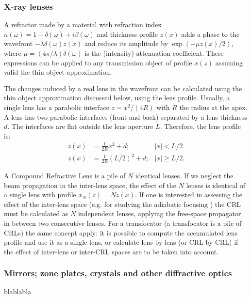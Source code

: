 \documentclass{iucr}              %
\begin{document}
\subsubsection{X-ray lenses}

A refractor made by a material with refraction index $n(\omega)=1-\delta(\omega)+i\beta(\omega)$ 
and thickness profile $z(x)$ adds a phase to the wavefront $-\lambda \delta(\omega) z(x)$ and reduce its amplitude by $\exp(-\mu z(x)/2)$, where $\mu=(4 \pi/\lambda) \delta(\omega)$ is the (intensity) attenuation coefficient. These expressions can be applied to any transmission object of profile $x(z)$ assuming valid the thin object approximation. 

The changes induced by a real lens in the wavefront can be calculated using the thin object approximation discussed below, using the lens profile. Usually, a single lens has a parabolic interface $z=x^2/(4R)$ with $R$ the radius at the apex. A lens has two parabolic interfaces (front and back) separated by a lens thickness $d$. The interfaces are flat outside the lens aperture $L$. Therefore, the lens profile is:
\begin{align}
    z(x) &= \frac{1}{2R} x^2 + d; & |x| < L/2\\ \nonumber
    z(x) &= \frac{1}{2R} (L/2)^2 + d; & |x| \ge L/2.
\end{align}

A Compound Refractive Lens is a pile of $N$ identical lenses. If we neglect the beam propagation in the inter-lens space, the effect of the $N$ lenses is identical of a single lens with profile $x_N(z)=N z(x)$. If one is interested in assessing the effect of the inter-lens space (e.g. for studying the adiabatic focusing \cite{Schroer_adiabatic}) the CRL must be calculated as $N$ independent lenses, applying the free-space propagator in between two consecutive lenses. For a transfocator (a transfocator is a pile of CRLs) the same concept apply: it is possible to compute the accumulated lens profile and use it as a single lens, or calculate lens by lens (or CRL by CRL) if the effect of inter-lens or inter-CRL spaces are to be taken into account.

\subsubsection{Mirrors; zone plates, crystals and other diffractive optics} blablabla 
\end{document}
